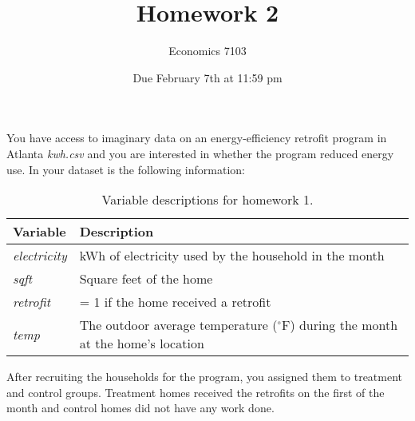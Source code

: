 \documentclass{article}
\title{Homework 2}
\author{Economics 7103}
\date{Due February 7th at 11:59 pm}
\begin{document}
  
\maketitle

\noindent You have access to imaginary data on an energy-efficiency retrofit program in Atlanta \textit{kwh.csv} and you are interested in whether the program reduced energy use.  In your dataset is the following information:
\begin{table}[h]
    \centering
    \begin{tabular}{l|l}
        Variable & Description \\ \hline
         \textit{electricity} & kWh of electricity used by the household in the month  \\
         \textit{sqft} & Square feet of the home \\
         \textit{retrofit} & = 1 if the home received a retrofit \\
         \textit{temp} & The outdoor average temperature ($^\circ$F) during the month at the home's location \\
    \end{tabular}
    \caption{Variable descriptions for homework 1.}
    \label{tab:variables}
\end{table}

After recruiting the households for the program, you assigned them to treatment and control groups.  Treatment homes received the retrofits on the first of the month and control homes did not have any work done.
\end{document}
